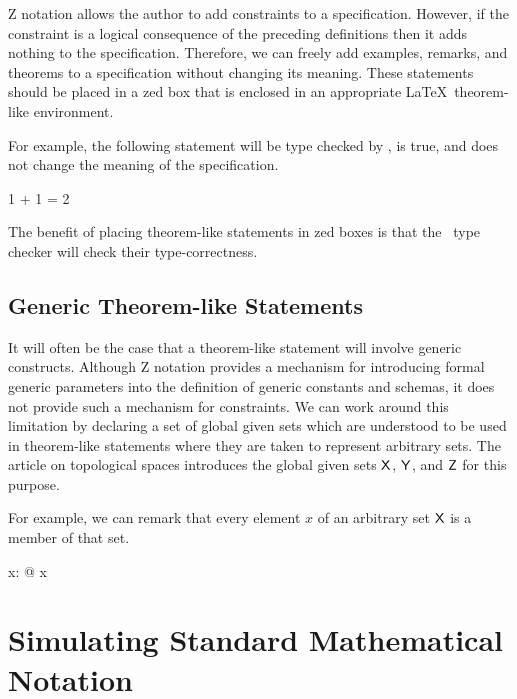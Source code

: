 \documentclass[11pt, oneside]{article}
\begin{document}
Z notation allows the author to add constraints to a specification.
However, if the constraint is a logical consequence of the preceding definitions then it adds nothing to the specification.
Therefore, we can freely add examples, remarks, and theorems to a specification without changing its meaning.
These statements should be placed in a zed box that is enclosed in an appropriate \LaTeX\ theorem-like environment.

For example, the following statement will be type checked by \fuzz, is true, and does not change the meaning of
the specification.

\begin{example}

\begin{zed}
	1 + 1 = 2
\end{zed}
	
\end{example}

The benefit of placing theorem-like statements in zed boxes is that the \fuzz\ type checker will check their type-correctness.

\subsection{Generic Theorem-like Statements}

It will often be the case that a theorem-like statement will involve generic constructs.
Although Z notation provides a mechanism for introducing formal generic parameters into the definition of 
generic constants and schemas, it does not provide such a mechanism for constraints.
We can work around this limitation by declaring a set of global given sets which are understood to be used in theorem-like
statements where they are taken to represent arbitrary sets.
The article on topological spaces introduces the global given sets $\mathsf{X}$, $\mathsf{Y}$, and $\mathsf{Z}$ for this purpose.

For example, we can remark that every element $x$ of an arbitrary set $\mathsf{X}$ is a member of that set.

\begin{remark}

\begin{zed}
	\forall x: \setX @ x \in \setX
\end{zed}

\end{remark}

\section{Simulating Standard Mathematical Notation}
\end{document}
